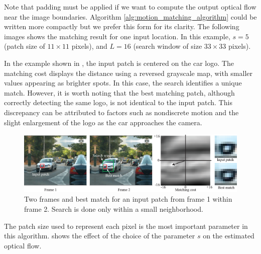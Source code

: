 Note that padding must be applied if we want to compute the output optical flow near the image boundaries. Algorithm \ref{alg:motion_matching_algorithm} could be written more compactly but we prefer this form for its clarity. The following images shows the matching result for one input location. In this example, $s=5$ (patch size of $11\times11$ pixels), and $L=16$ (search window of size $33\times33$ pixels).



In the example shown in \fig{\ref{fig:matching_cost_figure}}, the input patch is centered on the car logo. The matching cost displays the distance using a reversed grayscale map, with smaller values appearing as brighter spots. In this case, the search identifies a unique match. However, it is worth noting that the best matching patch, although correctly detecting the same logo, is not identical to the input patch. This discrepancy can be attributed to factors such as nondiscrete motion and the slight enlargement of the logo as the car approaches the camera.


\begin{figure}[h!]
    \includegraphics[width=1\linewidth]{figures/optical_flow/matching_cost_figure.eps}
    \caption{Two frames and best match for an input patch from frame 1 within frame 2. Search is done only within a small neighborhood.}
    \label{fig:matching_cost_figure}
\end{figure}

The patch size used to represent each pixel is the most important parameter in this algorithm. \Fig{\ref{fig:matching_optical_flow_patch_size_effect}} shows the effect of the choice of the parameter $s$ on the estimated optical flow.


